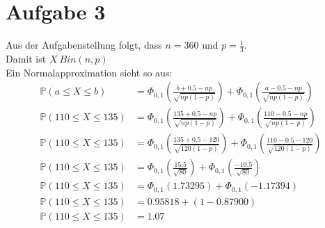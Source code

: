 \documentclass[a4paper,10pt]{article}
\title{}
\author{}
\newcommand{\Wk}[1]{\ensuremath{\mathbb{P}(#1)}}
\begin{document}
\maketitle



\section*{Aufgabe 3}
Aus der Aufgabenstellung folgt, dass $n = 360$ und $p = \frac{1}{3}$.\\
Damit ist $X ~ Bin(n,p)$ \\
Ein Normalapproximation sieht so aus:\\
\begin {align*}
\Wk{a \leq X \leq b} & = \Phi_{0,1}(\frac{b+0.5-np}{\sqrt{np(1-p)}}) +   \Phi_{0,1}(\frac{a-0.5-np}{\sqrt{np(1-p)}})  \\
\Wk{110 \leq X \leq 135} & = \Phi_{0,1}(\frac{135+0.5-np}{\sqrt{np(1-p)}}) +   \Phi_{0,1}(\frac{110-0.5-np}{\sqrt{np(1-p)}}) \\
\Wk{110 \leq X \leq 135} & = \Phi_{0,1}(\frac{135+0.5-120}{\sqrt{120(1-p)}}) +   \Phi_{0,1}(\frac{110-0.5-120}{\sqrt{120(1-p)}}) \\
\Wk{110 \leq X \leq 135} & = \Phi_{0,1}(\frac{15.5}{\sqrt{80}}) +   \Phi_{0,1}(\frac{-10.5}{\sqrt{80}}) \\
\Wk{110 \leq X \leq 135} & = \Phi_{0,1}(1.73295) + \Phi_{0,1}(-1.17394) \\
\Wk{110 \leq X \leq 135} & = 0.95818 +(1-0.87900) \\
\Wk{110 \leq X \leq 135} & = 1.07
\end {align*}
\end{document}
